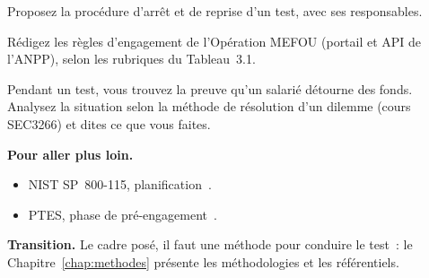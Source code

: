 \begin{boxexo}[title={\ding{45}\quad Exercice~3.8. Mot d'arrêt \niveaumoyen}]
Proposez la procédure d'arrêt et de reprise d'un test, avec ses
responsables.
\end{boxexo}

\begin{boxexo}[title={\ding{45}\quad Exercice~3.9. Des règles complètes \niveauexpert}]
Rédigez les règles d'engagement de l'Opération MEFOU (portail et API de
l'ANPP), selon les rubriques du Tableau~3.1.
\end{boxexo}

\begin{boxexo}[title={\ding{45}\quad Exercice~3.10. Le dilemme \niveauexpert}]
Pendant un test, vous trouvez la preuve qu'un salarié détourne des fonds.
Analysez la situation selon la méthode de résolution d'un dilemme (cours
SEC3266) et dites ce que vous faites.
\end{boxexo}

\bigskip

\begin{boxinfo}
\textbf{Pour aller plus loin.}
\begin{itemize}
    \item NIST SP~800-115, planification~\cite{nist800115}.
    \item PTES, phase de pré-engagement~\cite{ptes}.
\end{itemize}
\end{boxinfo}

\begin{boxinfo}
\textbf{Transition.} Le cadre posé, il faut une méthode pour conduire le
test~: le Chapitre~\ref{chap:methodes} présente les méthodologies et les
référentiels.
\end{boxinfo}
